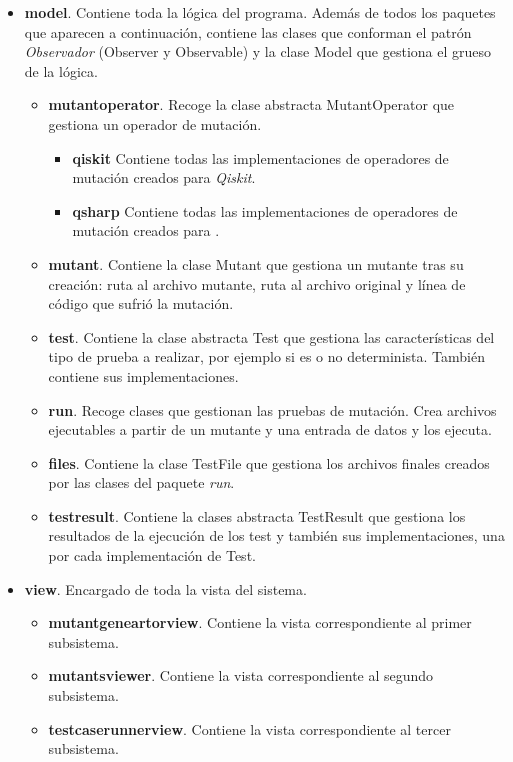 \begin{itemize}
\item \textbf{model}. Contiene toda la lógica del programa. Además de todos los paquetes que aparecen a continuación, contiene las clases que conforman el patrón \textit{Observador} (Observer y Observable) y la clase Model que gestiona el grueso de la lógica.
	\begin{itemize}
	\item \textbf{mutantoperator}. Recoge la clase abstracta MutantOperator que gestiona un operador de mutación.
		\begin{itemize}
		\item \textbf{qiskit} Contiene todas las implementaciones de operadores de mutación creados para \textit{Qiskit}.
		\item \textbf{qsharp} Contiene todas las implementaciones de operadores de mutación creados para \qsh.
		\end{itemize}		 
	\item \textbf{mutant}. Contiene la clase Mutant que gestiona un mutante tras su creación: ruta al archivo mutante, ruta al archivo original y línea de código que sufrió la mutación.
	\item \textbf{test}. Contiene la clase abstracta Test que gestiona las características del tipo de prueba a realizar, por ejemplo si es o no determinista. También contiene sus implementaciones.
	\item \textbf{run}. Recoge clases que gestionan las pruebas de mutación. Crea archivos ejecutables a partir de un mutante y una entrada de datos y los ejecuta.
	\item \textbf{files}. Contiene la clase TestFile que gestiona los archivos finales creados por las clases del paquete \textit{run}.
	\item \textbf{testresult}. Contiene la clases abstracta TestResult que gestiona los resultados de la ejecución de los test y también sus implementaciones, una por cada implementación de Test.
	\end{itemize}
\item \textbf{view}. Encargado de toda la vista del sistema.
	\begin{itemize}
	\item \textbf{mutantgeneartorview}. Contiene la vista correspondiente al primer subsistema.
	\item \textbf{mutantsviewer}. Contiene la vista correspondiente al segundo subsistema.
	\item \textbf{testcaserunnerview}. Contiene la vista correspondiente al tercer subsistema.

\end{itemize}
\end{itemize}
